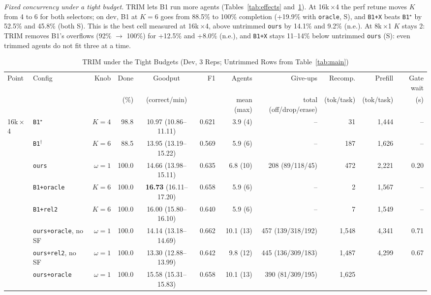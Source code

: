 \documentclass[conference]{IEEEtran}
\newcommand{\K}{$K$}
\newcommand{\x}{$\times$}
\newcommand{\pick}{$^\star$}
\newcommand{\topk}{$^\dagger$}
\newcommand{\cfg}[1]{\texttt{#1}}
\begin{document}
\emph{Fixed concurrency under a tight budget.} TRIM lets B1 run more agents
(Tables~\ref{tab:effects} and~\ref{tab:trim}). At 16k\,\x4 the perf retune moves \K{} from 4 to 6 for
both selectors; on dev, B1 at $K{=}6$ goes from 88.5\% to 100\% completion (+19.9\% with \cfg{oracle},
S), and \cfg{B1+X} beats \cfg{B1}\pick{} by 52.5\% and 45.8\% (both S). This is the best cell measured
at 16k\,\x4, above untrimmed \cfg{ours} by 14.1\% and 9.2\% (n.e.). At 8k\,\x1 \K{} stays 2: TRIM
removes B1's overflows (92\% $\rightarrow$ 100\%) for +12.5\% and +8.0\% (n.e.), and \cfg{B1+X} stays
11--14\% below untrimmed \cfg{ours} (S): even trimmed agents do not fit three at a time.

\begin{table}[!t]
  \caption{TRIM under the Tight Budgets (Dev, 3 Reps; Untrimmed Rows from Table~\ref{tab:main})}
  \label{tab:trim}
  \centering
  \scriptsize
  \setlength{\tabcolsep}{3.4pt}
  \renewcommand{\arraystretch}{0.9}
  \begin{tabular}{@{}llrrcrrrrrr@{}}
    \toprule
    Point & Config & Knob & Done & Goodput & F1 & Agents & Give-ups & Recomp. & Prefill & Gate wait \\
     & & & (\%) & (correct/min) & & mean (max) & total (off/drop/erase) & (tok/task) & (tok/task) & (s) \\
    \midrule
    16k\,\x4 & \cfg{B1}\pick & $K{=}4$ & 98.8 & 10.97 (10.86--11.11) & 0.621 & 3.9 (4) & -- & 31 & 1,444 & -- \\
     & \cfg{B1}\topk & $K{=}6$ & 88.5 & 13.95 (13.19--15.22) & 0.569 & 5.9 (6) & -- & 187 & 1,626 & -- \\
     & \cfg{ours} & $\omega{=}1$ & 100.0 & 14.66 (13.98--15.11) & 0.635 & 6.8 (10) & 208 (89/118/45) & 472 & 2,221 & 0.20 \\
     & \cfg{B1+oracle} & $K{=}6$ & 100.0 & \textbf{16.73} (16.11--17.20) & 0.658 & 5.9 (6) & -- & 2 & 1,567 & -- \\
     & \cfg{B1+rel2} & $K{=}6$ & 100.0 & 16.00 (15.80--16.10) & 0.640 & 5.9 (6) & -- & 7 & 1,549 & -- \\
     & \cfg{ours+oracle}, no SF & $\omega{=}1$ & 100.0 & 14.14 (13.18--14.69) & 0.662 & 10.1 (13) & 457 (139/318/192) &
      1,548 & 4,341 & 0.71 \\
     & \cfg{ours+rel2}, no SF & $\omega{=}1$ & 100.0 & 13.30 (12.88--13.99) & 0.642 & 9.8 (12) & 445 (136/309/183) &
      1,487 & 4,299 & 0.67 \\
     & \cfg{ours+oracle} & $\omega{=}1$ & 100.0 & 15.58 (15.31--15.83) & 0.658 & 10.1 (13) & 390 (81/309/195) & 1,625 &

\end{tabular}
\end{table}
\end{document}
